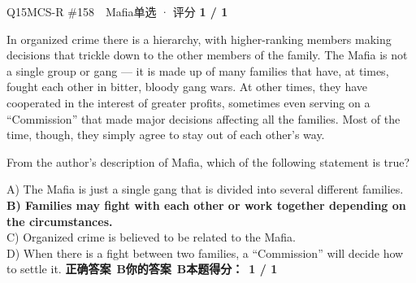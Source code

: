\begin{qblock}{Q15\quad MCS-R \#158\ \ Mafia}{单选 · 评分 \textcolor{cAccent}{\bfseries 1 / 1}}
\begin{promptbox}
In organized crime there is a hierarchy, with higher-ranking members making decisions that trickle down to the other members of the family. The Mafia is not a single group or gang --- it is made up of many families that have, at times, fought each other in bitter, bloody gang wars. At other times, they have cooperated in the interest of greater profits, sometimes even serving on a ``Commission'' that made major decisions affecting all the families. Most of the time, though, they simply agree to stay out of each other's way.
\end{promptbox}
\begin{notebox}From the author's description of Mafia, which of the following statement is true?\end{notebox}
{\small
A) The Mafia is just a single gang that is divided into several different families.\\
{\color{cFix}\textbf{B) Families may fight with each other or work together depending on the circumstances.}}\\
C) Organized crime is believed to be related to the Mafia.\\
D) When there is a fight between two families, a ``Commission'' will decide how to settle it.}
\smallskip
\textbf{正确答案}\ \textcolor{cFix}{\bfseries B}\qquad\textbf{你的答案}\ \textcolor{cFix}{\bfseries B}\qquad\textbf{本题得分：}\ {\color{cAccent}\bfseries 1 / 1}
\end{qblock}

